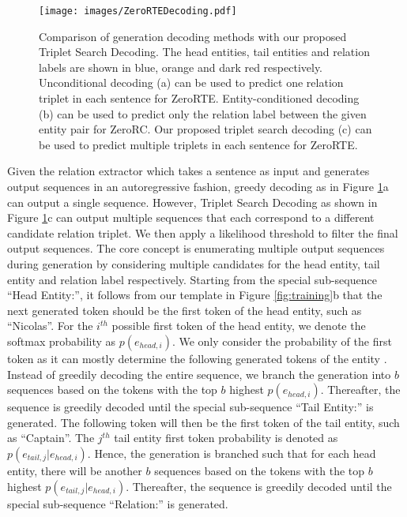 \documentclass[11pt]{article}
\begin{document}
\begin{figure}[!t]
\centering
\texttt{[image: images/ZeroRTEDecoding.pdf]}
\caption{
Comparison of generation decoding methods with our proposed Triplet Search Decoding. 
The head entities, tail entities and relation labels are shown in blue, orange and dark red respectively.
Unconditional decoding (a) can be used to predict one relation triplet in each sentence for ZeroRTE. 
Entity-conditioned decoding (b) can be used to predict only the relation label between the given entity pair for ZeroRC.
Our proposed triplet search decoding (c) can be used to predict multiple triplets in each sentence for ZeroRTE.
}
\label{fig:decoding}
\end{figure}

Given the relation extractor which takes a sentence as input and generates output sequences in an autoregressive fashion, greedy decoding as in Figure \ref{fig:decoding}a can output a single sequence. 
However, Triplet Search Decoding as shown in Figure \ref{fig:decoding}c can output multiple sequences that each correspond to a different candidate relation triplet. 
We then apply a likelihood threshold to filter the final output sequences.
The core concept is enumerating multiple output sequences during generation by considering multiple candidates for the head entity, tail entity and relation label respectively.
Starting from the special sub-sequence ``Head Entity:'', it follows from our template in Figure \ref{fig:training}b that the next generated token should be the first token of the head entity, such as ``Nicolas''. 
For the $i^{th}$ possible first token of the head entity, we denote the softmax probability as $p(e_{head,i})$.
We only consider the probability of the first token as it can mostly determine the following generated tokens of the entity \cite{Zhao2021Calibrate}. 
Instead of greedily decoding the entire sequence, we branch the generation into $b$ sequences based on the tokens with the top $b$ highest $p(e_{head,i})$.
Thereafter, the sequence is greedily decoded until the special sub-sequence ``Tail Entity:'' is generated. 
The following token will then be the first token of the tail entity, such as ``Captain''.
The $j^{th}$ tail entity first token probability is denoted as $p(e_{tail,j}|e_{head,i})$.
Hence, the generation is branched such that for each head entity, there will be another $b$ sequences based on the tokens with the top $b$ highest $p(e_{tail,j}|e_{head,i})$.
Thereafter, the sequence is greedily decoded until the special sub-sequence ``Relation:'' is generated. 
\end{document}
